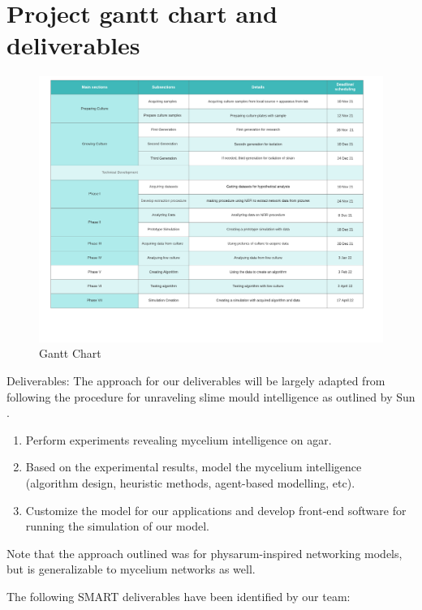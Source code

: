 \section{Project gantt chart and deliverables}
\begin{figure}
    \includegraphics[scale=0.6]{Images/gantt_chart.png}
    \caption{Gantt Chart}
    \label{fig:gantt}
\end{figure}

Deliverables: The approach for our deliverables will be largely adapted from following the procedure for unraveling slime mould intelligence as outlined by Sun
\cite{steiner_tree}.
    
    \begin{enumerate}
        \item Perform experiments revealing mycelium intelligence on agar.
        \item Based on the experimental results, model the mycelium intelligence (algorithm design, heuristic methods, agent-based modelling, etc).
        \item Customize the model for our applications and develop front-end software for running the simulation of our model.
    \end{enumerate}
    
    Note that the approach outlined was for physarum-inspired networking models, but is generalizable to mycelium networks as well.
    
    The following SMART deliverables have been identified by our team:
    
